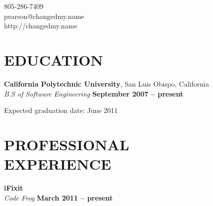 \documentclass[margin,line]{resume}
\begin{document}
{
    \sc
    \hfill 805-286-7409                   \vspace{0mm}\\\vspace{0mm}%
    \hfill pearson@changedmy.name         \vspace{0mm}\\\vspace{0mm}%
    \hfill http://changedmy.name          \vspace{0mm}\\\vspace{-9mm}%
}

\begin{resume}

\vspace{6mm}

    \section{\mysidestyle \textbf{\large{E}\small{DUCATION}}}

    \textbf{\listing California Polytechnic University}, San Luis Obispo, California \vspace{2mm}\\\vspace{1mm}%
    \textsl{B.S of Software Engineering} \hfill \textbf{ September 2007 -- present}\vspace{-3mm}\\\vspace{-1mm}%
    \begin{list2}
        \item Expected graduation date: June 2011
    \end{list2}\vspace{-1.5mm}


\sectionline

    \section{\mysidestyle \textbf{\large{P}\small{ROFESSIONAL\\EXPERIENCE}}}

    \textbf{\listing iFixit} \vspace{2mm}\\\vspace{1mm}%
    \textsl{Code Frog} \hfill \textbf{March 2011 -- present}\\


\end{resume}
\end{document}
